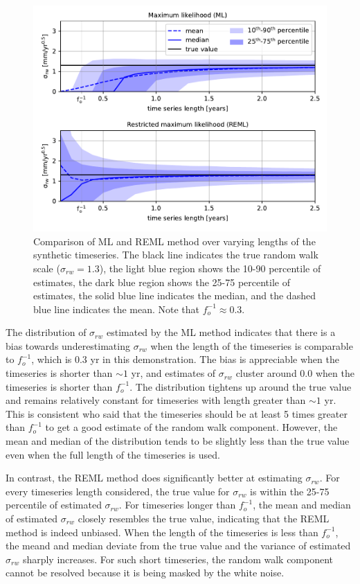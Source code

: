 \documentclass[10pt,a4paper]{article}
\begin{document}
\begin{figure}
\includegraphics[scale=1.0]{figure_1.pdf}
\caption{Comparison of ML and REML method over varying lengths of the synthetic timeseries. The black line indicates the true random walk scale ($\sigma_{rw}=1.3$), the light blue region shows the 10-90 percentile of estimates, the dark blue region shows the 25-75 percentile of estimates, the solid blue line indicates the median, and the dashed blue line indicates the mean. Note that $f_o^{-1} \approx 0.3$.}   
\label{fig:EstimateRW}
\end{figure}

The distribution of $\sigma_{rw}$ estimated by the ML method indicates that there is a bias towards underestimating $\sigma_{rw}$ when the length of the timeseries is comparable to $f_o^{-1}$, which is 0.3 yr in this demonstration. The bias is appreciable when the timeseries is shorter than ${\sim}1$ yr, and estimates of $\sigma_{rw}$ cluster around 0.0 when the timeseries is shorter than $f_o^{-1}$. The distribution tightens up around the true value and remains relatively constant for timeseries with length greater than ${\sim}1$ yr. This is consistent \citet{Langbein1997} who said that the timeseries should be at least 5 times greater than $f_o^{-1}$ to get a good estimate of the random walk component. However, the mean and median of the distribution tends to be slightly less than the true value even when the full length of the timeseries is used.

In contrast, the REML method does significantly better at estimating $\sigma_{rw}$. For every timeseries length considered, the true value for $\sigma_{rw}$ is within the 25-75 percentile of estimated $\sigma_{rw}$. For timeseries longer than $f_o^{-1}$, the mean and median of estimated $\sigma_{rw}$ closely resembles the true value, indicating that the REML method is indeed unbiased. When the length of the timeseries is less than $f_o^{-1}$, the meand and median deviate from the true value and the variance of estimated $\sigma_{rw}$ sharply increases. For such short timeseries, the random walk component cannot be resolved because it is being masked by the white noise. 
  
\end{document}
